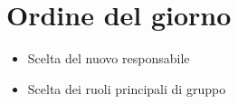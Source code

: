 \section{Ordine del giorno}

\begin{itemize}
    \item Scelta del nuovo responsabile
    \item Scelta dei ruoli principali di gruppo
\end{itemize}